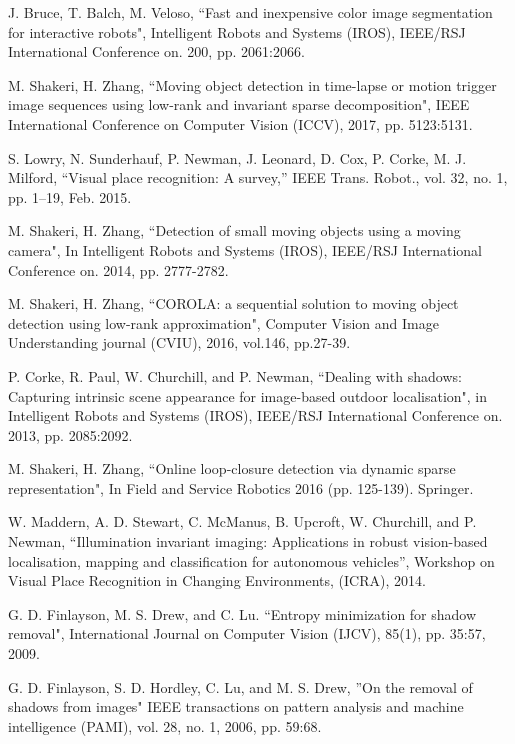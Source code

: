 \documentclass[letterpaper, 10 pt, conference]{ieeeconf}
\begin{document}
\begin{thebibliography}{99}

 J. Bruce, T. Balch, M. Veloso, ``Fast and inexpensive color image segmentation for interactive robots", Intelligent Robots and Systems (IROS), IEEE/RSJ International Conference on. 200, pp. 2061:2066.

 M. Shakeri, H. Zhang, ``Moving object detection in time-lapse or motion trigger image sequences using low-rank and invariant sparse decomposition", IEEE International Conference on Computer Vision (ICCV), 2017, pp. 5123:5131.

 S. Lowry, N. Sunderhauf, P. Newman, J. Leonard, D. Cox, P. Corke, M. J. Milford, “Visual place recognition: A survey,” IEEE Trans. Robot., vol. 32, no. 1, pp. 1–19, Feb. 2015.

 M. Shakeri, H. Zhang, ``Detection of small moving objects using a moving camera", In Intelligent Robots and Systems (IROS), IEEE/RSJ International Conference on. 2014, pp. 2777-2782.

 M. Shakeri, H. Zhang, ``COROLA: a sequential solution to moving object detection using low-rank approximation", Computer Vision and Image Understanding journal (CVIU), 2016, vol.146, pp.27-39.

 P. Corke, R. Paul, W. Churchill, and P. Newman, ``Dealing with shadows: Capturing intrinsic scene appearance for image-based outdoor localisation", in Intelligent Robots and Systems (IROS), IEEE/RSJ International Conference on. 2013, pp. 2085:2092.

 M. Shakeri, H. Zhang, ``Online loop-closure detection via dynamic sparse representation", In Field and Service Robotics 2016 (pp. 125-139). Springer.

 W. Maddern, A. D. Stewart, C. McManus, B. Upcroft, W. Churchill, and P. Newman, “Illumination invariant imaging: Applications in robust vision-based localisation, mapping and classification for autonomous vehicles”, Workshop on Visual Place Recognition in Changing
Environments, (ICRA), 2014.

 G. D. Finlayson, M. S. Drew, and C. Lu. ``Entropy minimization for shadow removal", International Journal on Computer Vision (IJCV), 85(1), pp. 35:57, 2009.

 G. D. Finlayson, S. D. Hordley, C. Lu, and M. S. Drew, ''On the
removal of shadows from images" IEEE transactions on pattern
analysis and machine intelligence (PAMI), vol. 28, no. 1, 2006, pp. 59:68.


\end{thebibliography}
\end{document}
